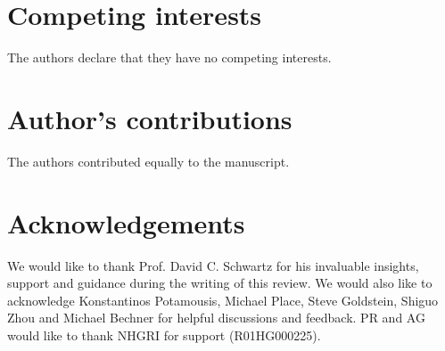 \documentclass{bmcart}
\begin{document}
\begin{backmatter}

\section*{Competing interests}
  The authors declare that they have no competing interests.

\section*{Author's contributions}
 The authors contributed equally to the manuscript. 

\section*{Acknowledgements}
We would like to thank Prof. David C. Schwartz for his invaluable insights, 
support and guidance during the writing of this review. We would also like to acknowledge Konstantinos Potamousis, Michael Place, Steve Goldstein, 
Shiguo Zhou and Michael Bechner for helpful discussions and feedback. PR and AG 
would like to thank NHGRI for support (R01HG000225).   




\end{backmatter}
\end{document}
